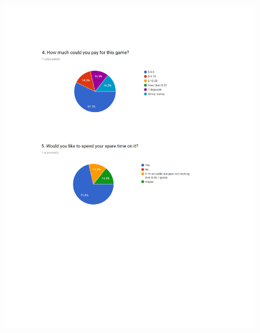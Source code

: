 \documentclass[12p]{article}
\begin{document}
\begin{figure}[ht]
  \center
  \includegraphics[width=\textwidth,height=\textheight,keepaspectratio]{surveyresults2.png}
  \label{fig:survey_results_2}
\end{figure}

\end{document}
